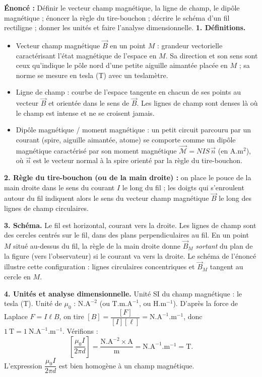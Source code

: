 \documentclass[11pt]{article}
\newcommand{\cle}[1]{{\popxbold\color{popdark}#1}}
\begin{document}
\begin{corrige}
\textbf{Énoncé :} Définir le vecteur champ magnétique, la ligne de champ, le dipôle magnétique ; énoncer la règle du tire-bouchon ; décrire le schéma d'un fil rectiligne ; donner les unités et faire l'analyse dimensionnelle.
\tcblower
\textbf{1. Définitions.}
\begin{itemize}
\item \cle{Vecteur champ magnétique} $\vec{B}$ en un point $M$ : grandeur vectorielle caractérisant l'état magnétique de l'espace en $M$. Sa direction et son sens sont ceux qu'indique le pôle nord d'une petite aiguille aimantée placée en $M$ ; sa norme se mesure en tesla (T) avec un teslamètre.
\item \cle{Ligne de champ} : courbe de l'espace tangente en chacun de ses points au vecteur $\vec{B}$ et orientée dans le sens de $\vec{B}$. Les lignes de champ sont denses là où le champ est intense et ne se croisent jamais.
\item \cle{Dipôle magnétique / moment magnétique} : un petit circuit parcouru par un courant (spire, aiguille aimantée, atome) se comporte comme un dipôle magnétique caractérisé par son moment magnétique $\vec{\mathcal{M}} = N I S\,\vec{n}$ (en $\mathrm{A.m^2}$), où $\vec{n}$ est le vecteur normal à la spire orienté par la règle du tire-bouchon.
\end{itemize}

\textbf{2. Règle du tire-bouchon (ou de la main droite) :} on place le pouce de la main droite dans le sens du courant $I$ le long du fil ; les doigts qui s'enroulent autour du fil indiquent alors le sens du vecteur champ magnétique $\vec{B}$ le long des lignes de champ circulaires.

\textbf{3. Schéma.} Le fil est horizontal, courant vers la droite. Les lignes de champ sont des cercles centrés sur le fil, dans des plans perpendiculaires au fil. En un point $M$ situé au-dessus du fil, la règle de la main droite donne $\vec{B}_M$ \emph{sortant} du plan de la figure (vers l'observateur) si le courant va vers la droite. Le schéma de l'énoncé illustre cette configuration : lignes circulaires concentriques et $\vec{B}_M$ tangent au cercle en $M$.

\textbf{4. Unités et analyse dimensionnelle.}
Unité SI du champ magnétique : le \cle{tesla} (T). Unité de $\mu_0$ : $\mathrm{N.A^{-2}}$ (ou $\mathrm{T.m.A^{-1}}$, ou $\mathrm{H.m^{-1}}$).
D'après la force de Laplace $F = I\ell B$, on tire $[B] = \dfrac{[F]}{[I][\ell]} = \mathrm{N.A^{-1}.m^{-1}}$, donc $1\ \mathrm{T} = 1\ \mathrm{N.A^{-1}.m^{-1}}$.
Vérifions :
\[ \left[\frac{\mu_0 I}{2\pi d}\right] = \frac{\mathrm{N.A^{-2}}\times\mathrm{A}}{\mathrm{m}} = \mathrm{N.A^{-1}.m^{-1}} = \mathrm{T}. \]
L'expression $\dfrac{\mu_0 I}{2\pi d}$ est bien homogène à un champ magnétique.
\end{corrige}
\end{document}
